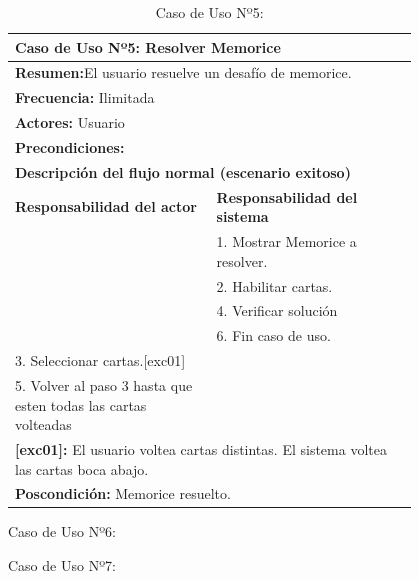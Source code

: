 \begin{table}[H]
    \centering
    \caption{Caso de Uso Nº5: }
    
    \begin{tabular}{| p{0.4\linewidth} | p{0.4\linewidth} |}
        \hline
        \multicolumn{2}{|l|}{\textbf{Caso de Uso Nº5:}  Resolver Memorice} \\
        \hline
        \multicolumn{2}{|l|}{\textbf{Resumen:}El usuario resuelve un desafío de memorice.} \\
        \hline
        \multicolumn{2}{|l|}{\textbf{Frecuencia:}  Ilimitada} \\
        \hline
        \multicolumn{2}{|l|}{\textbf{Actores:}  Usuario} \\
        \hline
        \multicolumn{2}{|l|}{\textbf{Precondiciones:}} \\
        \hline
        \multicolumn{2}{|l|}{\textbf{Descripción del flujo normal (escenario exitoso)} } \\
        \hline
        \textbf{Responsabilidad del actor} & \textbf{Responsabilidad del sistema}\\
            & 1. Mostrar Memorice a resolver.\\
            & 2. Habilitar cartas. \\
            & 4. Verificar solución \\
            & 6. Fin caso de uso. \\
        3. Seleccionar cartas.[exc01] &\\
        5. Volver al paso 3 hasta que esten todas las cartas volteadas &\\
        \hline
        \multicolumn{2}{|p{0.8\linewidth}|}{\textbf{[exc01]:} El usuario voltea cartas distintas. El sistema voltea las cartas boca abajo.} \\
        \hline
        \multicolumn{2}{|l|}{\textbf{Poscondición:}  Memorice resuelto.} \\
        \hline
    \end{tabular}

    \label{table:5}
\end{table}

\begin{table}[H]
    \centering
    \caption{Caso de Uso Nº6: }
    


    \label{table:6}
\end{table}

\begin{table}[H]
    \centering
    \caption{Caso de Uso Nº7: }
    


    \label{table:7}
\end{table}

